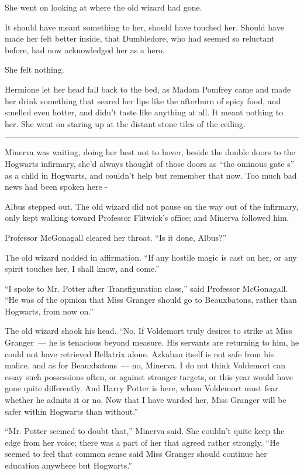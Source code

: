 She went on looking at where the old wizard had gone.

It should have meant something to her, should have touched her. Should have made her felt better inside, that Dumbledore, who had seemed so reluctant before, had now acknowledged her as a hero.

She felt nothing.

Hermione let her head fall back to the bed, as Madam Pomfrey came and made her drink something that seared her lips like the afterburn of spicy food, and smelled even hotter, and didn't taste like anything at all. It meant nothing to her. She went on staring up at the distant stone tiles of the ceiling.

\begin{center}\rule{3in}{0.4pt}\end{center}

Minerva was waiting, doing her best not to hover, beside the double doors to the Hogwarts infirmary, she'd always thought of those doors as ``the ominous gate s'' as a child in Hogwarts, and couldn't help but remember that now. Too much bad news had been spoken here -

Albus stepped out. The old wizard did not pause on the way out of the infirmary, only kept walking toward Professor Flitwick's office; and Minerva followed him.

Professor McGonagall cleared her throat. ``Is it done, Albus?''

The old wizard nodded in affirmation. ``If any hostile magic is cast on her, or any spirit touches her, I shall know, and come.''

``I spoke to Mr. Potter after Transfiguration class,'' said Professor McGonagall. ``He was of the opinion that Miss Granger should go to Beauxbatons, rather than Hogwarts, from now on.''

The old wizard shook his head. ``No. If Voldemort truly desires to strike at Miss Granger~--- he is tenacious beyond measure. His servants are returning to him, he could not have retrieved Bellatrix alone. Azkaban itself is not safe from his malice, and as for Beauxbatons~--- no, Minerva. I do not think Voldemort can essay such possessions often, or against stronger targets, or this year would have gone quite differently. And Harry Potter is here, whom Voldemort must fear whether he admits it or no. Now that I have warded her, Miss Granger will be safer within Hogwarts than without.''

``Mr. Potter seemed to doubt that,'' Minerva said. She couldn't quite keep the edge from her voice; there was a part of her that agreed rather strongly. ``He seemed to feel that common sense said Miss Granger should continue her education anywhere but Hogwarts.''


